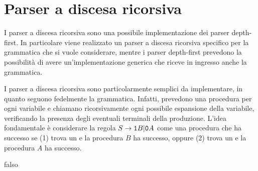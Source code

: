 \section{Parser a discesa ricorsiva}\label{sec:recursive-descent}

I parser a discesa ricorsiva sono una possibile implementazione dei parser depth-first.
In particolare viene realizzato un parser a discesa ricorsiva specifico per la grammatica che si vuole considerare,
mentre i parser depth-first prevedono la possibilità di avere un'implementazione generica che riceve in ingresso anche
la grammatica.

I parser a discesa ricorsiva sono
particolarmente semplici da implementare, in quanto seguono fedelmente la grammatica.
Infatti, prevedono una procedura per ogni variabile e chiamano ricorsivamente ogni possibile espansione della variabile,
verificando la presenza degli eventuali terminali della produzione.
L'idea fondamentale è considerare la regola $S\to  \uno B | \zero A$ come una procedura che ha successo se (1) trova un
\uno e la procedura $B$ ha successo, oppure (2) trova un \zero e la procedura $A$ ha successo.

\begin{algorithm}[bt!]
\Return falso
\caption{Procedura per la produzione $S\to  \uno B | \zero A$}
\label{alg:recursive-descent-example-01}
\end{algorithm}





